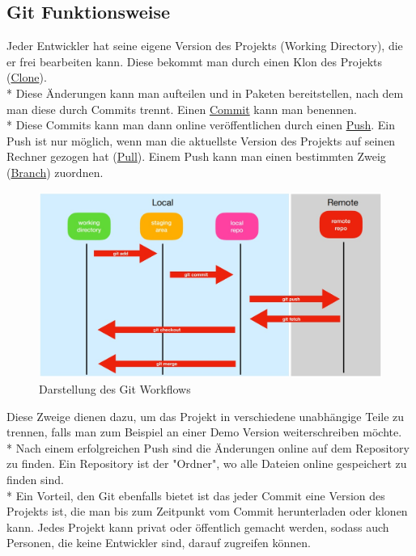 \subsection{Git Funktionsweise}
Jeder Entwickler hat seine eigene Version des Projekts (Working Directory), die er frei bearbeiten kann. Diese bekommt man durch einen Klon des Projekts (\hyperref[sec:Clone]{Clone}). \\* Diese Änderungen kann man aufteilen und 
in Paketen bereitstellen, nach dem man diese durch Commits trennt. Einen \hyperref[sec:Commit]{Commit} kann man benennen. \\*
Diese Commits kann man dann online veröffentlichen durch einen \hyperref[sec:Push]{Push}. Ein Push ist nur möglich, wenn man die aktuellste Version des Projekts
auf seinen Rechner gezogen hat (\hyperref[sec:Pull]{Pull}). 
Einem Push kann man einen bestimmten Zweig (\hyperref[sec:Branch]{Branch}) zuordnen. 
\begin{figure}[htp]
    \author{David Ignjatovic}
    \centering
    \includegraphics[scale=0.35]{pics/GitWorkflow.jpg}
    \caption{Darstellung des Git Workflows}
    \label{fig:impl:GitWorkflow}
\end{figure}
Diese Zweige dienen dazu, um das Projekt in verschiedene
unabhängige Teile zu trennen, falls man zum Beispiel an einer Demo Version weiterschreiben möchte. \\* Nach einem erfolgreichen Push sind die Änderungen
online auf dem Repository zu finden. Ein Repository ist der "Ordner", wo alle Dateien online gespeichert zu finden sind. 
\\* Ein Vorteil, den Git ebenfalls bietet ist das jeder Commit eine Version des Projekts ist, die man bis zum Zeitpunkt vom Commit herunterladen oder klonen kann.
Jedes Projekt kann privat oder öffentlich gemacht werden, sodass auch Personen, die keine Entwickler sind, darauf zugreifen können.
\cite{GitExpl} 



